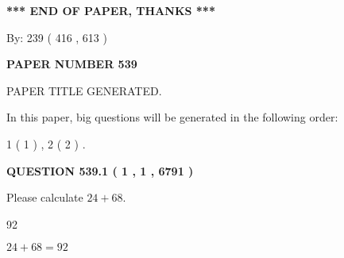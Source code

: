 \documentclass[12pt]{article}
\begin{document}
   
\vspace{1.0in} 
{\textbf{\large{ *** END OF PAPER, THANKS *** }}} 
   
   
\hspace{1.0in} By: 
 239 ( 416 ,  613 )
   
   
   
   
\newpage 
\setcounter{page}{ 
   539001 } 
   
   
   
   
 {\textbf{ \Large{ PAPER NUMBER  539  }}}
   
   
\vspace{0.2in}
   
   
   
   
   
   
   
   
 \vspace{0.2in}
 
 
 
 
   
   
 PAPER TITLE GENERATED.
   
   
   
\vspace{0.2in}
   
In this paper, big questions will be generated in the following order: 
   
   
   1 ( 1 )
 ,
   2 ( 2 )
 .
  
\vspace{0.2in}
  
{\textbf{\Large{QUESTION
539.1 
 ( 1 , 1 , 6791 )
}}}
  
  
 
Please calculate $ %
24 +  %
68 $.
 
 
 
\noindent{}
 
 

92
 
 
\noindent{}
 
 

 
 
 
\noindent{}
 
 

$ %
24 +  %
68=   %
92$
 
\end{document}
